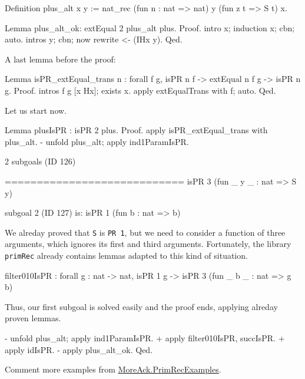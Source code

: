 \begin{Coqsrc}
Definition plus_alt x y  :=
              nat_rec  (fun n : nat => nat)
                       y
                       (fun z t =>  S t)
                       x.

Lemma plus_alt_ok:
  extEqual 2 plus_alt plus.
Proof.
  intro x; induction x; cbn; auto.
  intros y; cbn; now rewrite <- (IHx y).
Qed.
\end{Coqsrc}

A last lemma before the proof:

\begin{Coqsrc}
Lemma isPR_extEqual_trans n : forall f g, isPR n f ->
                                    extEqual n f g ->
                                    isPR n g.
Proof.
 intros f g [x Hx]; exists x.
 apply extEqualTrans with f; auto.
Qed.
\end{Coqsrc}

Let us start now.

\begin{Coqsrc}
Lemma plusIsPR : isPR 2 plus.
Proof.
  apply isPR_extEqual_trans with plus_alt.
  - unfold plus_alt; apply ind1ParamIsPR.
\end{Coqsrc}

\begin{Coqanswer}
2 subgoals (ID 126)
  
  ============================
  isPR 3 (fun _ y _ : nat => S y)

subgoal 2 (ID 127) is:
 isPR 1 (fun b : nat => b)
\end{Coqanswer}

We alreday proved that \texttt{S} is \texttt{PR 1}, but we need to consider a function of three arguments, which ignores its first and third arguments.
Fortunately, the library \texttt{primRec} already contains lemmas adapted to this kind of situation.

\begin{Coqanswer}
filter010IsPR :
forall g : nat -> nat, isPR 1 g -> isPR 3 (fun _ b _ : nat => g b)
\end{Coqanswer}

Thus, our first subgoal is solved easily and the proof ends, applying alreday proven lemmas.


\begin{Coqsrc}
 - unfold plus_alt; apply ind1ParamIsPR.
    + apply filter010IsPR, succIsPR.
    + apply idIsPR.
  - apply plus_alt_ok. 
Qed.
\end{Coqsrc}


\begin{todo}
Comment more examples from   \href{../theories/html/hydras.MoreAck.PrimRecExamples.html}{MoreAck.PrimRecExamples}.
\end{todo}


